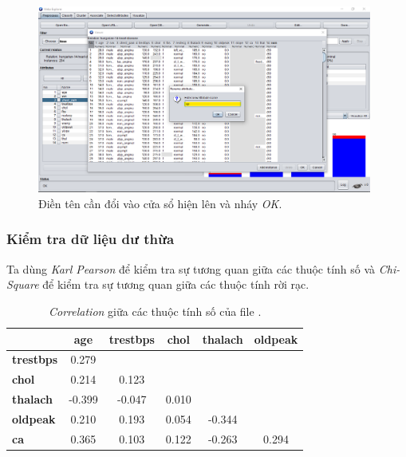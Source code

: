 \begin{figure}[H]
\centering
\includegraphics[width=0.98\textwidth]{1/b2.png}
\caption{Điền tên cần đổi vào cửa sổ hiện lên và nháy \textit{OK}.}
\end{figure}

\subsubsection{Kiểm tra dữ liệu dư thừa}
Ta dùng \textit{Karl Pearson} để kiểm tra sự tương quan giữa các thuộc tính số và \textit{Chi-Square} để kiểm tra sự tương quan giữa các thuộc tính rời rạc.
\begin{table}[H]
\centering
\renewcommand{\arraystretch}{1.5}
\caption {\textit{Correlation} giữa các thuộc tính số của file .}
\begin{tabular}{@{}lccccc@{}}
\toprule
                  & \textbf{age} & \textbf{trestbps} & \textbf{chol} & \textbf{thalach} & \textbf{oldpeak} \\ \midrule
\textbf{trestbps} & 0.279        &                   &               &                  &                  \\
\textbf{chol}     & 0.214        & 0.123             &               &                  &                  \\
\textbf{thalach}  & -0.399       & -0.047            & 0.010         &                  &                  \\
\textbf{oldpeak}  & 0.210        & 0.193             & 0.054         & -0.344           &                  \\
\textbf{ca}       & 0.365        & 0.103             & 0.122         & -0.263           & 0.294            \\ \bottomrule
\end{tabular}
\end{table}


